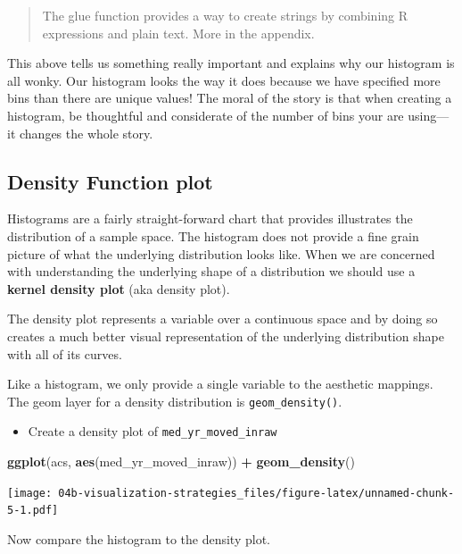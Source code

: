 \documentclass[
]{book}
\newenvironment{Shaded}{\begin{snugshade}}{\end{snugshade}}
\newcommand{\KeywordTok}[1]{\textcolor[rgb]{0.13,0.29,0.53}{\textbf{#1}}}
\newcommand{\NormalTok}[1]{#1}
\newcommand{\OperatorTok}[1]{\textcolor[rgb]{0.81,0.36,0.00}{\textbf{#1}}}
\newcommand{\StringTok}[1]{\textcolor[rgb]{0.31,0.60,0.02}{#1}}
\providecommand{\tightlist}{%
  \setlength{\itemsep}{0pt}\setlength{\parskip}{0pt}}
\begin{document}
\begin{quote}
The glue function provides a way to create strings by combining R expressions and plain text. More in the appendix.
\end{quote}

This above tells us something really important and explains why our histogram is all wonky. Our histogram looks the way it does because we have specified more bins than there are unique values! The moral of the story is that when creating a histogram, be thoughtful and considerate of the number of bins your are using---it changes the whole story.

\hypertarget{density-function-plot}{%
\subsection{Density Function plot}\label{density-function-plot}}

Histograms are a fairly straight-forward chart that provides illustrates the distribution of a sample space. The histogram does not provide a fine grain picture of what the underlying distribution looks like. When we are concerned with understanding the underlying shape of a distribution we should use a \textbf{kernel density plot} (aka density plot).

The density plot represents a variable over a continuous space and by doing so creates a much better visual representation of the underlying distribution shape with all of its curves.

Like a histogram, we only provide a single variable to the aesthetic mappings. The geom layer for a density distribution is \texttt{geom\_density()}.

\begin{itemize}
\tightlist
\item
  Create a density plot of \texttt{med\_yr\_moved\_inraw}
\end{itemize}

\begin{Shaded}
\begin{Highlighting}[]
\KeywordTok{ggplot}\NormalTok{(acs, }\KeywordTok{aes}\NormalTok{(med\_yr\_moved\_inraw)) }\OperatorTok{+}
\StringTok{  }\KeywordTok{geom\_density}\NormalTok{()}
\end{Highlighting}
\end{Shaded}

\texttt{[image: 04b-visualization-strategies\_files/figure-latex/unnamed-chunk-5-1.pdf]}

Now compare the histogram to the density plot.
\end{document}
